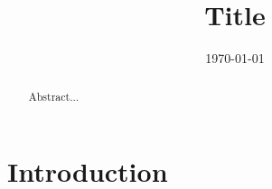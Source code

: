 \documentclass[prb,preprint,letterpaper,noeprint,longbibliography,nodoi,footinbib]{revtex4-1}
\begin{document}

\title{Title}

%


\date{\today}

\begin{abstract}

Abstract...

\end{abstract}

\maketitle

\section{Introduction}
\end{document}
